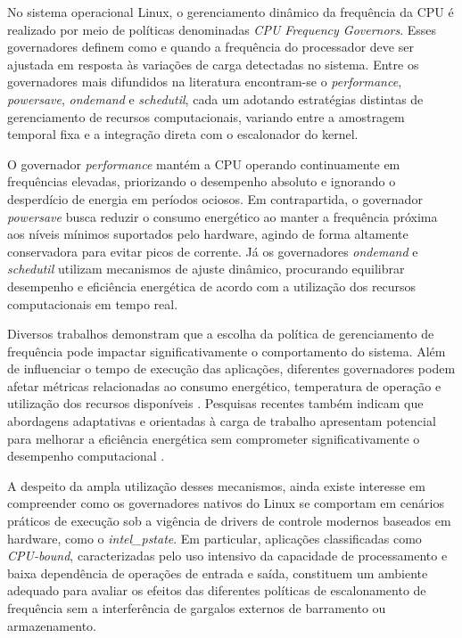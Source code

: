 \documentclass[12pt]{article}
\begin{document}
No sistema operacional Linux, o gerenciamento dinâmico da frequência da CPU é realizado por meio de políticas denominadas \textit{CPU Frequency Governors}. Esses governadores definem como e quando a frequência do processador deve ser ajustada em resposta às variações de carga detectadas no sistema. Entre os governadores mais difundidos na literatura encontram-se o \textit{performance}, \textit{powersave}, \textit{ondemand} e \textit{schedutil}, cada um adotando estratégias distintas de gerenciamento de recursos computacionais, variando entre a amostragem temporal fixa e a integração direta com o escalonador do kernel.

O governador \textit{performance} mantém a CPU operando continuamente em frequências elevadas, priorizando o desempenho absoluto e ignorando o desperdício de energia em períodos ociosos. Em contrapartida, o governador \textit{powersave} busca reduzir o consumo energético ao manter a frequência próxima aos níveis mínimos suportados pelo hardware, agindo de forma altamente conservadora para evitar picos de corrente. Já os governadores \textit{ondemand} e \textit{schedutil} utilizam mecanismos de ajuste dinâmico, procurando equilibrar desempenho e eficiência energética de acordo com a utilização dos recursos computacionais em tempo real.

Diversos trabalhos demonstram que a escolha da política de gerenciamento de frequência pode impactar significativamente o comportamento do sistema. Além de influenciar o tempo de execução das aplicações, diferentes governadores podem afetar métricas relacionadas ao consumo energético, temperatura de operação e utilização dos recursos disponíveis \cite{kistowski2018, hebbar2021, zhou2023}. Pesquisas recentes também indicam que abordagens adaptativas e orientadas à carga de trabalho apresentam potencial para melhorar a eficiência energética sem comprometer significativamente o desempenho computacional \cite{spiliopoulos2011}.

A despeito da ampla utilização desses mecanismos, ainda existe interesse em compreender como os governadores nativos do Linux se comportam em cenários práticos de execução sob a vigência de drivers de controle modernos baseados em hardware, como o \textit{intel\_pstate}. Em particular, aplicações classificadas como \textit{CPU-bound}, caracterizadas pelo uso intensivo da capacidade de processamento e baixa dependência de operações de entrada e saída, constituem um ambiente adequado para avaliar os efeitos das diferentes políticas de escalonamento de frequência sem a interferência de gargalos externos de barramento ou armazenamento.
\end{document}
